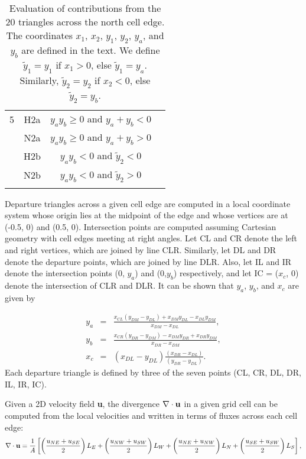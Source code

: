 \begin{table}
\begin{center}
\begin{tabular}{cccc}
5         &    H2a     &  $y_a y_b\geq 0$ and $y_a+y_b<0$      \\
          &    N2a     &  $y_a y_b\geq 0$ and $y_a+y_b>0$      \\
          &    H2b     &  $y_a y_b<0$ and $\tilde{y}_2<0$      \\
          &    N2b     &  $y_a y_b<0$ and $\tilde{y}_2>0$      \\
          &            &                                       \\
\hline
\end{tabular}
\caption{\label{table:triangles} Evaluation of contributions from the 20 triangles across
the north cell edge.  The coordinates $x_1$, $x_2$, $y_1$, $y_2$,
$y_a$, and $y_b$ are defined in the text. We define $\tilde{y}_1 =
y_1$ if $x_1>0$, else $\tilde{y}_1 = y_a$. Similarly, $\tilde{y}_2
= y_2$ if $x_2<0$, else $\tilde{y}_2 = y_b$.}
\end{center}
\end{table}

Departure triangles across a given cell edge are computed in a local coordinate system whose origin 
lies at the midpoint of the edge and whose vertices are at (-0.5, 0) and (0.5, 0).  
Intersection points are computed assuming Cartesian geometry with cell edges meeting at right angles.  
Let CL and CR denote the left and right vertices, which are joined by line CLR.   
Similarly, let DL and DR denote the departure points, which are joined by line DLR.  
Also, let IL and IR denote the intersection points (0, $y_a$) and (0,$y_b$) respectively, and 
let IC = ($x_c$, 0) denote the intersection of CLR and DLR.  
It can be shown that $y_a$, $y_b$, and $x_c$ are given by

\begin{equation}
  \begin{aligned}
    y_a &=& \frac {{x_{CL} (y_{DM}-y_{DL}) + x_{DM}y_{DL} - x_{DL}y_{DM}}} {x_{DM} - x_{DL}}, \\
    y_b &=& \frac {{x_{CR} (y_{DR}-y_{DM}) - x_{DM}y_{DR} + x_{DR}y_{DM}}} {x_{DR} - x_{DM}}, \\
    x_c &=& (x_{DL} - y_{DL}) \frac{(x_{DR} - x_{DL})} {(y_{DR} - y_{DL})}.
  \end{aligned}
\end{equation}
Each departure triangle is defined by three of the seven points (CL, CR, DL, DR, IL, IR, IC).

Given a 2D velocity field {\bf u}, the divergence $\nabla\cdot{\bf u}$  
in a given grid cell can be computed from the local velocities and written in terms of fluxes across each cell edge:
\begin{equation}
  \label{gliss.eq.IR_divergence}
  \nabla\cdot{\bf u} = \frac{1}{A} 
  \left[\left(\frac{u_{NE}+u_{SE}}{2}\right)L_E + \left(\frac{u_{NW}+u_{SW}}{2}\right)L_W + 
        \left(\frac{u_{NE}+u_{NW}}{2}\right)L_N + \left(\frac{u_{SE}+u_{SW}}{2}\right)L_S \right],
\end{equation}

